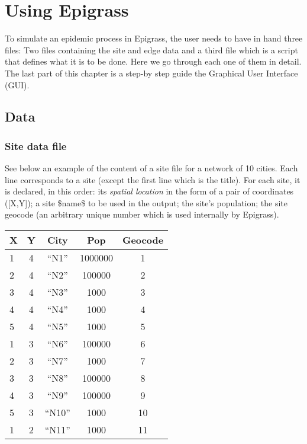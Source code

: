 \documentclass[a4paper,10pt]{manual}
\begin{document}
\hypertarget{using}{}\chapter{Using Epigrass}

To simulate an epidemic process in Epigrass, the user needs to have in hand three files: Two files containing the site and edge data and a third file which is a script that defines what it is to be done. Here we go through each one of them in detail. The last part of this chapter is a step-by step guide the Graphical User Interface (GUI).


\section{Data}


\subsection{Site data file}

See below an example of the content of a site file for a network of 10 cities. Each line corresponds to a site (except the first line which is the title). For each site, it is declared, in this order: its \emph{spatial location} in the form of a pair of coordinates ({[}X,Y{]}); a site \$name\$ to be used in the output; the site's population; the site geocode (an arbitrary unique number which is used internally by Epigrass).

\begin{tabulary}{\textwidth}{|l|c|c|c|c|}
\hline
\textbf{
X
} & \textbf{
Y
} & \textbf{
City
} & \textbf{
Pop
} & \textbf{
Geocode
}\\
\hline

1
 & 
4
 & 
``N1''
 & 
1000000
 & 
1
\\

2
 & 
4
 & 
``N2''
 & 
100000
 & 
2
\\

3
 & 
4
 & 
``N3''
 & 
1000
 & 
3
\\

4
 & 
4
 & 
``N4''
 & 
1000
 & 
4
\\

5
 & 
4
 & 
``N5''
 & 
1000
 & 
5
\\

1
 & 
3
 & 
``N6''
 & 
100000
 & 
6
\\

2
 & 
3
 & 
``N7''
 & 
1000
 & 
7
\\

3
 & 
3
 & 
``N8''
 & 
100000
 & 
8
\\

4
 & 
3
 & 
``N9''
 & 
100000
 & 
9
\\

5
 & 
3
 & 
``N10''
 & 
1000
 & 
10
\\

1
 & 
2
 & 
``N11''
 & 
1000
 & 
11
\\
\hline
\end{tabulary}
\end{document}
